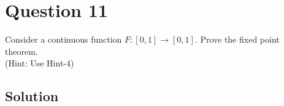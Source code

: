 \section*{Question 11}

Consider a continuous function \( F:[0,1] \rightarrow[0,1] \).
Prove the fixed point theorem. \\
(Hint: Use Hint-4)

\subsection*{Solution}
